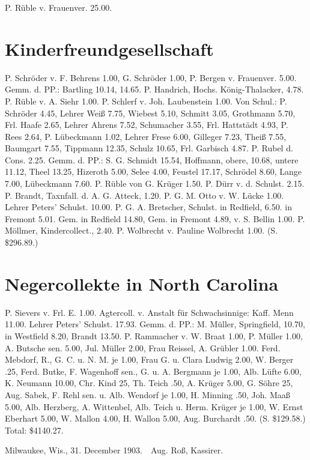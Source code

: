 P. Rüble v. Frauenver. 25.00.

\section{Kinderfreundgesellschaft}

P. Schröder v. F. Behrens 1.00, G. Schröder 1.00, P. Bergen v. Frauenver. 5.00. Gemm. d. PP.: Bartling 10.14,  14.65. P. Handrich, Hochs. König-Thalacker, 4.78. P. Rüble v. A. Siehr 1.00. P. Schlerf v. Joh. Laubenstein 1.00. Von Schul.: P. Schröder 4.45, Lehrer Weiß 7.75, Wiebest 5.10, Schmitt 3.05, Grothmann 5.70, Frl. Haafe 2.65, Lehrer Ahrens 7.52, Schumacher 3.55, Frl. Hattstädt 4.93, P. Rees 2.64, P. Lübeckmann 1.02, Lehrer Frese 6.00, Gilleger 7.23, Theiß 7.55, Baumgart 7.55, Tippmann 12.35, Schulz 10.65, Frl. Garbisch 4.87. P. Rubel d. Cons. 2.25. Gemm. d. PP.: S. G. Schmidt 15.54, Hoffmann, obere, 10.68, untere 11.12, Theel 13.25, Hizeroth 5.00, Selee 4.00, Feustel 17.17, Schrödel 8.60, Lange 7.00, Lübeckmann 7.60. P. Rüble von G. Krüger 1.50. P. Dürr v. d. Schulst. 2.15. P. Brandt, Taxnfall. d. A. G. Atteck, 1.20. P. G. M. Otto v. W. Lücke 1.00. Lehrer Peters' Schulst. 10.00. P. G. A. Bretscher, Schulst. in Redfield, 6.50. in Fremont 5.01. Gem. in Redfield 14.80, Gem. in Fremont 4.89, v. S. Bellin 1.00. P. Möllmer, Kindercollect., 2.40. P. Wolbrecht v. Pauline Wolbrecht 1.00. (S. \$296.89.)

\section{Negercollekte in North Carolina}

P. Sievers v. Frl. E. 1.00. Agtercoll. v. Anstalt für Schwachsinnige: Kaff. Menn 11.00. Lehrer Peters' Schulst. 17.93. Gemm. d. PP.: M. Müller, Springfield, 10.70, in Westfield 8.20, Brandt 13.50. P. Rammacher v. W. Braat 1.00, P. Müller 1.00, A. Butsche sen. 5.00, Jul. Müller 2.00, Frau Reissel, A. Grübler 1.00. Ferd. Mebdorf, R., G. C. u. N. M. je 1.00, Frau G. u. Clara Ludwig 2.00, W. Berger .25, Ferd. Butke, F. Wagenhoff sen., G. u. A. Bergmann je 1.00, Alb. Lüfte 6.00, K. Neumann 10.00, Chr. Kind 25, Th. Teich .50, A. Krüger 5.00, G. Söhre 25, Aug. Sabek, F. Rehl sen. u. Alb. Wendorf je 1.00, H. Minning .50, Joh. Maaß 5.00, Alb. Herzberg, A. Wittenbel, Alb. Teich u. Herm. Krüger je 1.00, W. Ernst Eberhart 5.00, W. Mallon 4.00, H. Wallon 5.00, Aug. Burchardt .50. (S. \$129.58.) Total: \$4140.27.

Milwaukee, Wis., 31. December 1903. Aug. Roß, Kassirer.
